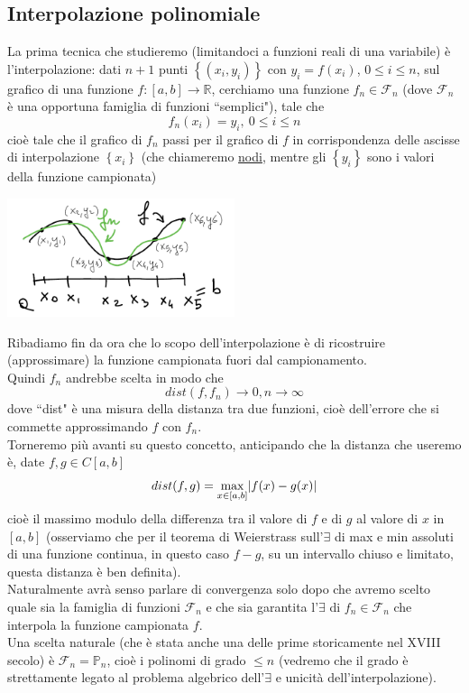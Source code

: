 \documentclass[12pt,headings=optiontohead]{article}
\DeclarePairedDelimiter{\abs}{\lvert}{\rvert}
\begin{document}
\subsection{Interpolazione polinomiale}
La prima tecnica che studieremo (limitandoci a funzioni reali di una variabile) è l'interpolazione: dati $n+1$ punti $\left\{ (x_i, y_i) \right\}$ con $y_i=f(x_i)$, $0 \leq i \leq n$, sul grafico di una funzione $f:[a,b] \rightarrow \mathbb{R}$, cerchiamo una funzione $f_n \in \mathcal{F}_n$ (dove $\mathcal{F}_n$ è una opportuna famiglia di funzioni ``semplici"), tale che
\[ f_n(x_i) = y_i, \ 0 \le i \le n \]
cioè tale che il grafico di $f_n$ passi per il grafico di $f$ in corrispondenza delle ascisse di interpolazione $\left\{ x_i \right\}$ (che chiameremo \uline{nodi}, mentre gli $\left\{ y_i \right\}$ sono i valori della funzione campionata)
\begin{center}
    \includegraphics[width=0.5\textwidth]{lez12_img1.png}
\end{center}
Ribadiamo fin da ora che lo scopo dell'interpolazione è di ricostruire (approssimare) la funzione campionata fuori dal campionamento.\\
Quindi $f_n$ andrebbe scelta in modo che 
\[ dist(f,f_n) \to 0, n \to \infty \]
dove ``dist" è una misura della distanza tra due funzioni, cioè dell'errore che si commette approssimando $f$ con $f_n$. \\
Torneremo più avanti su questo concetto, anticipando che la distanza che useremo è, date $f,g \in C[a,b]$
\[ dist(f,g) = \max_{x \in [a,b]} \abs{f(x) - g(x)} \]
cioè il massimo modulo della differenza tra il valore di $f$ e di $g$ al valore di $x$ in $[a,b]$ (osserviamo che per il teorema di Weierstrass sull'$\exists$ di max e min assoluti di una funzione continua, in questo caso $f-g$, su un intervallo chiuso e limitato, questa distanza è ben definita).\\
Naturalmente avrà senso parlare di convergenza solo dopo che avremo scelto quale sia la famiglia di funzioni $\mathcal{F}_n$ e che sia garantita l'$\exists$ di $f_n \in \mathcal{F}_n$ che interpola la funzione campionata $f$. \\
Una scelta naturale (che è stata anche una delle prime storicamente nel XVIII secolo) è $\mathcal{F}_n = \mathbb{P}_n$, cioè i polinomi di grado $\leq n$ (vedremo che il grado è strettamente legato al problema algebrico dell'$\exists$ e unicità dell'interpolazione).\\
\end{document}
